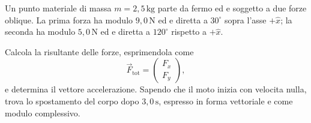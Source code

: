 
\begin{esercizio}
Un punto materiale di massa \(m = 2{,}5\,\mathrm{kg}\) parte da fermo ed e
soggetto a due forze oblique. La prima forza ha modulo \(9{,}0\,\mathrm{N}\)
ed e diretta a \(30^\circ\) sopra l'asse \(+\hat x\); la seconda ha modulo
\(5{,}0\,\mathrm{N}\) ed e diretta a \(120^\circ\) rispetto a \(+\hat x\).

Calcola la risultante delle forze, esprimendola come
\[
\vec F_\text{tot} =
\begin{pmatrix}
F_x \\[4pt]
F_y
\end{pmatrix},
\]
e determina il vettore accelerazione. Sapendo che il moto inizia con velocita
nulla, trova lo spostamento del corpo dopo \(3{,}0\,\mathrm{s}\), espresso in
forma vettoriale e come modulo complessivo.
\end{esercizio}

